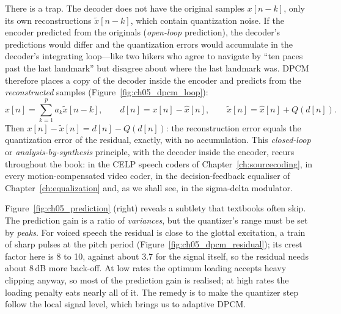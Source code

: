 There is a trap. The decoder does not have the original samples $x[n-k]$, only its own
reconstructions $\tilde x[n-k]$, which contain quantization noise. If the encoder predicted from
the originals (\emph{open-loop} prediction), the decoder's predictions would differ and the
quantization errors would accumulate in the decoder's integrating loop---like two hikers who agree
to navigate by ``ten paces past the last landmark'' but disagree about where the last landmark was.
DPCM therefore places a copy of the decoder inside the encoder and predicts from the
\emph{reconstructed} samples (Figure~\ref{fig:ch05_dpcm_loop}):
\begin{equation}
\hat x[n]=\sum_{k=1}^pa_k\tilde x[n-k],\qquad d[n]=x[n]-\hat x[n],\qquad
\tilde x[n]=\hat x[n]+Q(d[n]).
\label{eq:ch05:dpcm}
\end{equation}
Then $x[n]-\tilde x[n]=d[n]-Q(d[n])$: the reconstruction error equals the quantization error of
the residual, exactly, with no accumulation. This \emph{closed-loop} or
\emph{analysis-by-synthesis} principle, with the decoder inside the encoder, recurs throughout
the book: in the CELP speech coders of Chapter~\ref{ch:sourcecoding}, in every motion-compensated
video coder, in the decision-feedback equaliser of Chapter~\ref{ch:equalization} and, as we shall
see, in the sigma-delta modulator.


Figure~\ref{fig:ch05_prediction} (right) reveals a subtlety that textbooks often skip. The
prediction gain is a ratio of \emph{variances}, but the quantizer's range must be set by
\emph{peaks}. For voiced speech the residual is close to the glottal excitation, a train of
sharp pulses at the pitch period (Figure~\ref{fig:ch05_dpcm_residual}); its crest factor here is 8
to 10, against about 3.7 for the signal itself, so the residual needs about 8\,dB more back-off. At
low rates the optimum loading accepts heavy clipping anyway, so most of the prediction gain is
realised; at high rates the loading penalty eats nearly all of it. The remedy is to make the
quantizer step follow the local signal level, which brings us to adaptive DPCM.

